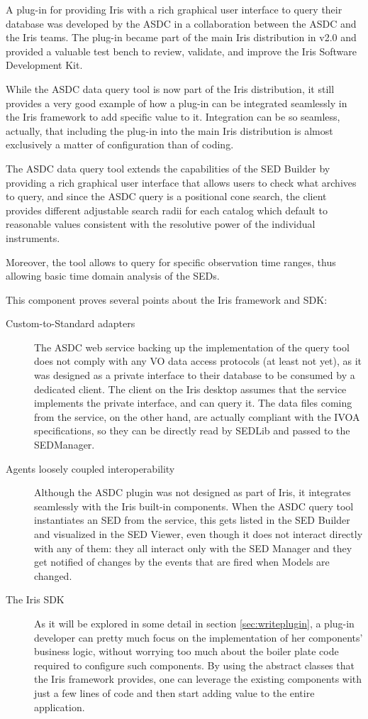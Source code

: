 \documentclass[preprint,12pt,3p]{elsarticle}
\begin{document}
A plug-in for providing Iris with a rich graphical user interface to query their database was developed by the ASDC in a collaboration between the ASDC and the Iris teams. The plug-in became part of the main Iris distribution in v2.0 and provided a valuable test bench to review, validate, and improve the Iris Software Development Kit.

While the ASDC data query tool is now part of the Iris distribution, it still provides a very good example of how a plug-in can be integrated seamlessly in the Iris framework to add specific value to it. Integration can be so seamless, actually, that including the plug-in into the main Iris distribution is almost exclusively a matter of configuration than of coding.

The ASDC data query tool extends the capabilities of the SED Builder by providing a rich graphical user interface that allows users to check what archives to query, and since the ASDC query is a positional cone search, the client provides different adjustable search radii for each catalog which default to reasonable values consistent with the resolutive power of the individual instruments.

Moreover, the tool allows to query for specific observation time ranges, thus allowing basic time domain analysis of the SEDs.

This component proves several points about the Iris framework and SDK:
\begin{description}
\item[Custom-to-Standard adapters] The ASDC web service backing up the implementation of the query tool does not comply with any VO data access protocols (at least not yet), as it was designed as a private interface to their database to be consumed by a dedicated client. The client on the Iris desktop assumes that the service implements the private interface, and can query it. The data files coming from the service, on the other hand, are actually compliant with the IVOA specifications, so they can be directly read by SEDLib and passed to the SEDManager.
\item[Agents loosely coupled interoperability] Although the ASDC plugin was not designed as part of Iris, it integrates seamlessly with the Iris built-in components. When the ASDC query tool instantiates an SED from the service, this gets listed in the SED Builder and visualized in the SED Viewer, even though it does not interact directly with any of them: they all interact only with the SED Manager and they get notified of changes by the events that are fired when Models are changed.
\item[The Iris SDK] As it will be explored in some detail in section \ref{sec:writeplugin}, a plug-in developer can pretty much focus on the implementation of her components' business logic, without worrying too much about the boiler plate code required to configure such components. By using the abstract classes that the Iris framework
provides, one can leverage the existing components with just a few lines of code and then start adding value to the entire application.
\end{description}
\end{document}
